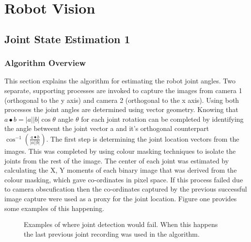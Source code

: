 \documentclass[./writeup.tex]{subfiles}
\begin{document}
\section{Robot Vision}
\subsection{Joint State Estimation 1}
\subsubsection{Algorithm Overview}
This section explains the algorithm for estimating the robot joint angles. Two separate, supporting processes are invoked to capture the images from camera 1 (orthogonal to the y axis) and camera 2 (orthogonal to the x axis). Using both processes the joint angles are determined using vector geometry. Knowing that $a \bullet b = |a| |b| \cos \theta$ angle $\theta$ for each joint rotation can be completed by identifying the angle betweent the joint vector a and it's orthogonal counterpart $\cos^{-1}(\frac{a \bullet b}{|a| |b|})$.
\newline
\newline
The first step is determining the joint location vectors from the images. This was completed by using colour masking techniques to isolate the joints from the rest of the image. The center of each joint was estimated by calculating the X, Y moments of each binary image that was derived from the colour masking, which gave co-ordinates in pixel space. If this process failed due to camera obscufication then the co-ordinates captured by the previous successful image capture were used as a proxy for the joint location. Figure one provides some examples of this happening.
\begin{figure}[h!]
    \centering
    \hfill
    \caption{Examples of where joint detection would fail. When this happens the last previous joint recording was used in the algorithm.}
\end{figure}
\end{document}
